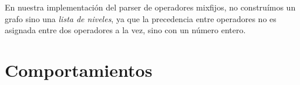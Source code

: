 \begin{implementationfr}
En nuestra implementación del parser de operadores mixfijos, no construímos un grafo sino una \emph{lista de niveles}, ya que la precedencia entre operadores no es asignada entre dos operadores a la vez, sino con un número entero.
\end{implementationfr}

\section{Comportamientos}
